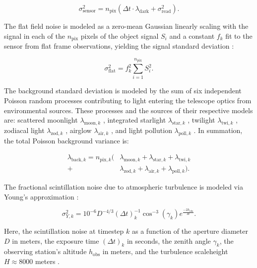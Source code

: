 \documentclass[a4paper,twocolumn]{spaceDebrisC} %
\begin{document}
\begin{equation} \label{eq:sensor_noise}
  \sigma_\text{sensor}^2 = n_\text{pix} \left( \Delta t \cdot \lambda_\text{dark} + \sigma_\text{read}^2 \right).
\end{equation}

The flat field noise is modeled as a zero-mean Gaussian linearly scaling with the signal in each of the $n_\text{pix}$ pixels of the object signal $S_i$ and a constant $f_k$ fit to the sensor from flat frame observations, yielding the signal standard deviation \cite{newberry1996}: 

\begin{equation}
  \sigma_\text{flat}^2 = f_k^2 \sum_{i=1}^{n_\text{pix}} S_i^2.
\end{equation}

The background standard deviation is modeled by the sum of six independent Poisson random processes contributing to light entering the telescope optics from environmental sources. These processes and the sources of their respective models are: scattered moonlight $\lambda_{\text{moon},k}$ \cite{daniels1977}, integrated starlight $\lambda_{\text{star},k}$ \cite{krag2003}, twilight $\lambda_{\text{twi},k}$ \cite{patat2006}, zodiacal light $\lambda_{\text{zod},k}$ \cite{roach1972}, airglow $\lambda_{\text{air},k}$ \cite{krag2003}, and light pollution $\lambda_{\text{poll},k}$ \cite{falchi2016, falchi2016_data}. In summation, the total Poisson background variance is:

\begin{equation}
  \begin{split}
  \lambda_{\text{back},k} = n_{\text{pix},k} ( &\lambda_{\text{moon},k} + \lambda_{\text{star},k} + \lambda_{\text{twi},k} \\+ &\lambda_{\text{zod},k} + \lambda_{\text{air},k} + \lambda_{\text{poll},k} ).
  \end{split}
\end{equation}

The fractional scintillation noise due to atmospheric turbulence is modeled via Young's approximation \cite{osborn2015}:

\begin{equation} \label{eq:scint_noise}
  \sigma^2_{Y,k} = 10^{-6} D^{-4/3} (\Delta t)_k^{-1} \cos^{-3}\left(\gamma_k\right) e^{\frac{-2h_\text{obs}}{H}}.
\end{equation}

Here, the scintillation noise at timestep $k$ as a function of the aperture diameter $D$ in meters, the exposure time $(\Delta t)_k$ in seconds, the zenith angle $\gamma_k$, the observing station's altitude $h_\text{obs}$ in meters, and the turbulence scaleheight $H\approx8000$ meters \cite{osborn2015}.
\end{document}
